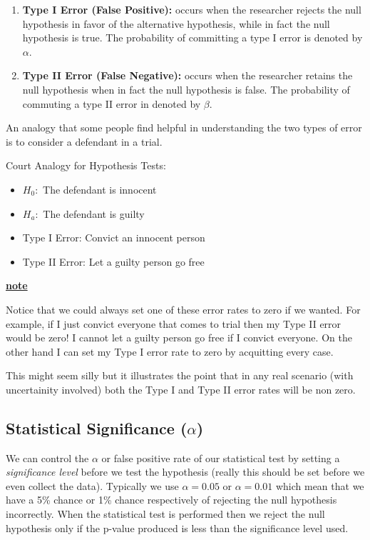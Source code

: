 \documentclass[
]{book}
\providecommand{\tightlist}{%
  \setlength{\itemsep}{0pt}\setlength{\parskip}{0pt}}
\newenvironment{rmdblock}[1]
  {\begin{shaded*}
  \centerline{\underline{\textbf{#1}}}

  }
  {
  \end{shaded*}
  }
\newenvironment{note}
  {\begin{rmdblock}{note}}
  {\end{rmdblock}}
\theoremstyle{definition}
\theoremstyle{definition}
\theoremstyle{definition}
\theoremstyle{definition}
\theoremstyle{remark}
\begin{document}
\begin{enumerate}
\def\labelenumi{\arabic{enumi}.}
\item
  \textbf{Type I Error (False Positive):} occurs when the researcher rejects the null hypothesis in favor of the alternative hypothesis, while in fact the null hypothesis is true. The probability of committing a type I error is denoted by \(\alpha\).
\item
  \textbf{Type II Error (False Negative):} occurs when the researcher retains the null hypothesis when in fact the null hypothesis is false. The probability of commuting a type II error in denoted by \(\beta\).
\end{enumerate}

An analogy that some people find helpful in understanding the two types of error is to consider a defendant in a trial.

Court Analogy for Hypothesis Tests:

\begin{itemize}
\tightlist
\item
  \(H_0:\) The defendant is innocent
\item
  \(H_a:\) The defendant is guilty
\item
  Type I Error: Convict an innocent person
\item
  Type II Error: Let a guilty person go free
\end{itemize}

\begin{note}
Notice that we could always set one of these error rates to zero if we wanted. For example, if I just convict everyone that comes to trial then my Type II error would be zero! I cannot let a guilty person go free if I convict everyone. On the other hand I can set my Type I error rate to zero by acquitting every case.

This might seem silly but it illustrates the point that in any real scenario (with uncertainity involved) both the Type I and Type II error rates will be non zero.
\end{note}

\hypertarget{statistical-significance-alpha}{%
\subsection{\texorpdfstring{Statistical Significance (\(\alpha\))}{Statistical Significance (\textbackslash alpha)}}\label{statistical-significance-alpha}}

We can control the \(\alpha\) or false positive rate of our statistical test by setting a \emph{significance level} before we test the hypothesis (really this should be set before we even collect the data). Typically we use \(\alpha=0.05\) or \(\alpha=0.01\) which mean that we have a 5\% chance or 1\% chance respectively of rejecting the null hypothesis incorrectly. When the statistical test is performed then we reject the null hypothesis only if the p-value produced is less than the significance level used.
\end{document}
